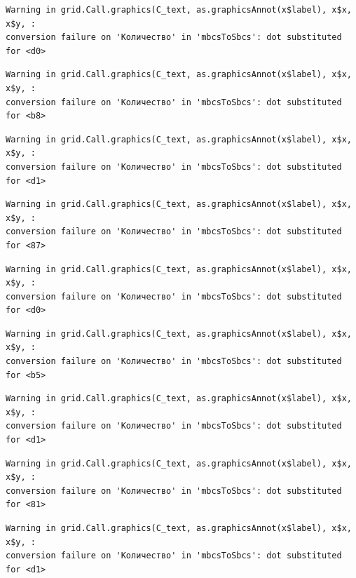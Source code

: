 \documentclass[
  letterpaper,
  DIV=11,
  numbers=noendperiod]{scrreprt}
\theoremstyle{definition}
\theoremstyle{remark}
\begin{document}
\begin{verbatim}
Warning in grid.Call.graphics(C_text, as.graphicsAnnot(x$label), x$x, x$y, :
conversion failure on 'Количество' in 'mbcsToSbcs': dot substituted for <d0>
\end{verbatim}

\begin{verbatim}
Warning in grid.Call.graphics(C_text, as.graphicsAnnot(x$label), x$x, x$y, :
conversion failure on 'Количество' in 'mbcsToSbcs': dot substituted for <b8>
\end{verbatim}

\begin{verbatim}
Warning in grid.Call.graphics(C_text, as.graphicsAnnot(x$label), x$x, x$y, :
conversion failure on 'Количество' in 'mbcsToSbcs': dot substituted for <d1>
\end{verbatim}

\begin{verbatim}
Warning in grid.Call.graphics(C_text, as.graphicsAnnot(x$label), x$x, x$y, :
conversion failure on 'Количество' in 'mbcsToSbcs': dot substituted for <87>
\end{verbatim}

\begin{verbatim}
Warning in grid.Call.graphics(C_text, as.graphicsAnnot(x$label), x$x, x$y, :
conversion failure on 'Количество' in 'mbcsToSbcs': dot substituted for <d0>
\end{verbatim}

\begin{verbatim}
Warning in grid.Call.graphics(C_text, as.graphicsAnnot(x$label), x$x, x$y, :
conversion failure on 'Количество' in 'mbcsToSbcs': dot substituted for <b5>
\end{verbatim}

\begin{verbatim}
Warning in grid.Call.graphics(C_text, as.graphicsAnnot(x$label), x$x, x$y, :
conversion failure on 'Количество' in 'mbcsToSbcs': dot substituted for <d1>
\end{verbatim}

\begin{verbatim}
Warning in grid.Call.graphics(C_text, as.graphicsAnnot(x$label), x$x, x$y, :
conversion failure on 'Количество' in 'mbcsToSbcs': dot substituted for <81>
\end{verbatim}

\begin{verbatim}
Warning in grid.Call.graphics(C_text, as.graphicsAnnot(x$label), x$x, x$y, :
conversion failure on 'Количество' in 'mbcsToSbcs': dot substituted for <d1>
\end{verbatim}
\end{document}
